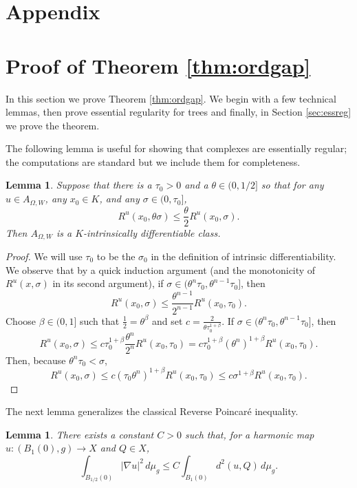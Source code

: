 \documentclass[12pt]{amsart}
\makeatletter
\newcommand\chaptername{Chapter}
\def\appendix{\par
  \c@chapter\z@ \c@section\z@
  \let\chaptername\appendixname
  \def\thechapter{\@Alph\c@chapter}}
\newcounter{chapter}
\newtheorem{lemma}[theorem]{Lemma}
\theoremstyle{definition}
\numberwithin{equation}{section}
\makeatother
\begin{document}
\appendix
\section*{Appendix}

\renewcommand{\thesection}{A} 
\section{Proof of Theorem \ref{thm:ordgap}}\label{app:proofof6}
In this section we prove Theorem \ref{thm:ordgap}. We begin with a few technical lemmas, then prove essential regularity for trees and finally, in Section \ref{sec:essreg} we prove the theorem.

The following lemma is useful for showing that complexes are essentially regular; the computations are standard but we include them for completeness.

\begin{lemma}\label{lem:intdifftheta}
Suppose that there is a $\tau_0>0$ and a $\theta\in(0,1/2]$ so that for any $u\in A_{\Omega,W}$, any $x_0\in K$, and any $\sigma\in(0,\tau_0]$, 
\[
R^u(x_0,\theta\sigma)\leq\frac\theta2R^u(x_0,\sigma).
\]
Then $A_{\Omega,W}$ is a $K$-intrinsically differentiable class.
\end{lemma}
\begin{proof}
We will use $\tau_0$ to be the $\sigma_0$ in the definition of intrinsic differentiability.  We observe that by a quick induction argument (and the monotonicity of $R^u(x,\sigma)$ in its second argument), if $\sigma\in(\theta^n\tau_0,\theta^{n-1}\tau_0]$, then
\[
R^u(x_0,\sigma)\leq\frac{\theta^{n-1}}{2^{n-1}}R^u(x_0,\tau_0).
\]
Choose $\beta\in (0,1]$ such that $\frac12=\theta^\beta$ and set $c=\frac{2}{\theta\tau_0^{1+\beta}}$. If $\sigma\in(\theta^n\tau_0,\theta^{n-1}\tau_0]$, then 
\[
R^u(x_0,\sigma)\leq c\tau_0^{1+\beta}\frac{\theta^n}{2^n}R^u(x_0,\tau_0)=c\tau_0^{1+\beta}(\theta^n)^{1+\beta}R^u(x_0,\tau_0).
\]
Then, because $\theta^n\tau_0<\sigma$,
\[
R^u(x_0,\sigma)\leq c(\tau_0\theta^n)^{1+\beta}R^u(x_0,\tau_0)\leq c\sigma^{1+\beta}R^u(x_0,\tau_0).
\]
\end{proof}

The next lemma generalizes the  classical Reverse Poincar\'e inequality. 

\begin{lemma} \label{lem:ReversePoincare}
There exists a constant $C>0$ such that, for a harmonic map $u:(B_1(0),g) \rightarrow X$ and $Q \in X$,
\[
\int_{B_{1/2}(0)} |\nabla u|^2 \, d\mu_g\leq C \int_{B_1(0)} d^2(u,Q)\, d\mu_g.
\]
\end{lemma}
\end{document}
